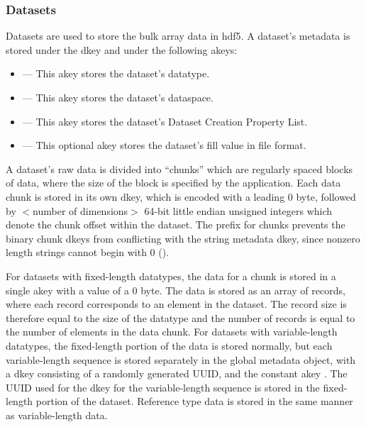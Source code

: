 \documentclass[../design_doc.tex]{subfiles}
\begin{document}
\newpage

\subsubsection{Datasets}

Datasets are used to store the bulk array data in \acrshort{hdf5}. A dataset's metadata is stored under the  \gls{dkey} and under the following \glspl{akey}:

\begin{itemize}
 \item {} --- This \gls{akey} stores the dataset's datatype.
 \item {} --- This \gls{akey} stores the dataset's dataspace.
 \item {} --- This \gls{akey} stores the dataset's Dataset Creation Property List.
 \item {} --- This optional \gls{akey} stores the dataset's fill value in file format.
\end{itemize}

A dataset's raw data is divided into ``chunks'' which are regularly spaced blocks of data, where the size of the block is specified by the application. Each data chunk is stored in its own \gls{dkey}, which is encoded with a leading 0 byte, followed by $<$number of dimensions$>$ 64-bit little endian unsigned integers which denote the chunk offset within the dataset. The  prefix for chunks prevents the binary chunk \glspl{dkey} from conflicting with the string metadata \gls{dkey}, since nonzero length strings cannot begin with 0 ().

For datasets with fixed-length datatypes, the data for a chunk is stored in a single \gls{akey} with a value of a 0 byte. The data is stored as an array of records, where each record corresponds to an element in the dataset. The record size is therefore equal to the size of the datatype and the number of records is equal to the number of elements in the data chunk. For datasets with variable-length datatypes, the fixed-length portion of the data is stored normally, but each variable-length sequence is stored separately in the global metadata object, with a \gls{dkey} consisting of a randomly generated UUID, and the constant \gls{akey} . The UUID used for the \gls{dkey} for the variable-length sequence is stored in the fixed-length portion of the dataset. Reference type data is stored in the same manner as variable-length data.
\end{document}
